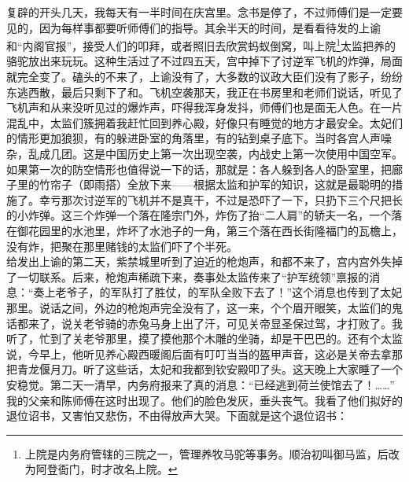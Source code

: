 复辟的开头几天，我每天有一半时间在庆宫里。念书是停了，不过师傅们是一定要见的，因为每样事都要听师傅们的指导。其余半天的时间，是看看待发的上谕和“内阁官报”，接受人们的叩拜，或者照旧去欣赏蚂蚁倒窝，叫上院\footnote{上院是内务府管辖的三院之一，管理养牧马驼等事务。顺治初叫御马监，后改为阿登衙门，时才改名上院。}太监把养的骆驼放出来玩玩。这种生活过了不过四五天，宫中掉下了讨逆军飞机的炸弹，局面就完全变了。磕头的不来了，上谕没有了，大多数的议政大臣们没有了影子，纷纷东逃西散，最后只剩下了和。飞机空袭那天，我正在书房里和老师们说话，听见了飞机声和从来没听见过的爆炸声，吓得我浑身发抖，师傅们也是面无人色。在一片混乱中，太监们簇拥着我赶忙回到养心殿，好像只有睡觉的地方才最安全。太妃们的情形更加狼狈，有的躲进卧室的角落里，有的钻到桌子底下。当时各宫人声噪杂，乱成几团。这是中国历史上第一次出现空袭，内战史上第一次使用中国空军。如果第一次的防空情形也值得说一下的话，那就是：各人躲到各人的卧室里，把廊子里的竹帘子（即雨搭）全放下来——根据太监和护军的知识，这就是最聪明的措施了。幸亏那次讨逆军的飞机并不是真干，不过是恐吓了一下，只扔下三个尺把长的小炸弹。这三个炸弹一个落在隆宗门外，炸伤了抬“二人肩”的轿夫一名，一个落在御花园里的水池里，炸坏了水池子的一角，第三个落在西长街隆福门的瓦檐上，没有炸，把聚在那里赌钱的太监们吓了个半死。\\

给发出上谕的第二天，紫禁城里听到了迫近的枪炮声，和都不来了，宫内宫外失掉了一切联系。后来，枪炮声稀疏下来，奏事处太监传来了“护军统领”禀报的消息：“奏上老爷子，的军队打了胜仗，的军队全败下去了！”这个消息也传到了太妃那里。说话之间，外边的枪炮声完全没有了，这一来，个个眉开眼笑，太监们的鬼话都来了，说关老爷骑的赤兔马身上出了汗，可见关帝显圣保过驾，才打败了。我听了，忙到了关老爷那里，摸了摸他那个木雕的坐骑，却是干巴巴的。还有个太监说，今早上，他听见养心殿西暖阁后面有叮叮当当的盔甲声音，这必是关帝去拿那把青龙偃月刀。听了这些话，太妃和我都到钦安殿叩了头。这天晚上大家睡了一个安稳觉。第二天一清早，内务府报来了真的消息：“已经逃到荷兰使馆去了！……”\\

我的父亲和陈师傅在这时出现了。他们的脸色发灰，垂头丧气。我看了他们拟好的退位诏书，又害怕又悲伤，不由得放声大哭。下面就是这个退位诏书：\\

